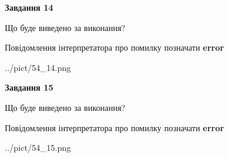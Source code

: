 \documentclass[11pt, ukrainian]{article}
\begin{document}
{\begin {large}
{\begin {center}\textbf{Завдання 14}\end {center}}\par
Що буде виведено за виконання? \par
Повідомлення інтерпретатора про помилку позначати \textbf{error}

\begin{center}
	{../pict/54_14.png}
\end{center}
\newpage

{\begin {center}\textbf{Завдання 15}\end {center}}\par
Що буде виведено за виконання? \par
Повідомлення інтерпретатора про помилку позначати \textbf{error}

\begin{center}
	{../pict/54_15.png}
\end{center}
\newpage

\end {large}}
\end{document}
